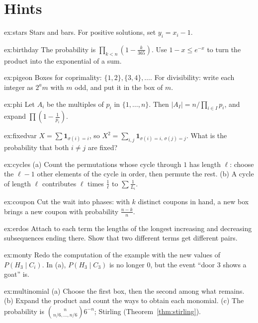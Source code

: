 \section{Hints}

\begin{hint}{ex:stars}
Stars and bars. For positive solutions, set $y_i=x_i-1$.
\end{hint}
\begin{hint}{ex:birthday}
The probability is $\prod_{k<n}\left(1-\frac k{365}\right)$. Use $1-x\le e^{-x}$ to turn the product into the exponential of a sum.
\end{hint}
\begin{hint}{ex:pigeon}
Boxes for coprimality: $\{1,2\},\{3,4\},\dots$. For divisibility: write each integer as $2^a m$ with $m$ odd, and put it in the box of $m$.
\end{hint}
\begin{hint}{ex:phi}
Let $A_i$ be the multiples of $p_i$ in $\{1,\dots,n\}$. Then $|A_I|=n/\prod_{i\in I}p_i$, and expand $\prod\left(1-\frac1{p_i}\right)$.
\end{hint}
\begin{hint}{ex:fixedvar}
$X=\sum\mathbf 1_{\sigma(i)=i}$, so $X^2=\sum_{i,j}\mathbf 1_{\sigma(i)=i,\,\sigma(j)=j}$. What is the probability that both $i\ne j$ are fixed?
\end{hint}
\begin{hint}{ex:cycles}
(a) Count the permutations whose cycle through $1$ has length $\ell$: choose the $\ell-1$ other elements of the cycle in order, then permute the rest. (b) A cycle of length $\ell$ contributes $\ell$ times $\frac1\ell$ to $\sum\frac1{L_i}$.
\end{hint}
\begin{hint}{ex:coupon}
Cut the wait into phases: with $k$ distinct coupons in hand, a new box brings a new coupon with probability $\frac{n-k}n$.
\end{hint}
\begin{hint}{ex:erdos}
Attach to each term the lengths of the longest increasing and decreasing subsequences ending there. Show that two different terms get different pairs.
\end{hint}
\begin{hint}{ex:monty}
Redo the computation of the example with the new values of $P(H_3\mid C_i)$. In (a), $P(H_3\mid C_3)$ is no longer $0$, but the event ``door $3$ shows a goat'' is.
\end{hint}
\begin{hint}{ex:multinomial}
(a) Choose the first box, then the second among what remains. (b) Expand the product and count the ways to obtain each monomial. (c) The probability is $\binom n{n/6,\dots,n/6}6^{-n}$; Stirling (Theorem~\ref{thm:stirling}).
\end{hint}
